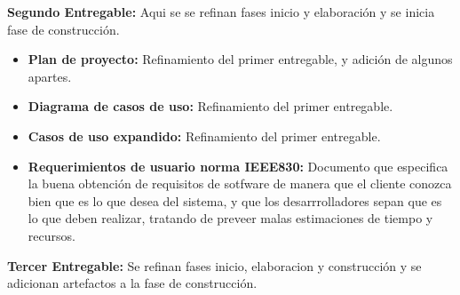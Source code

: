 \documentclass[11pt]{article}
\begin{document}
                \textbf{Segundo Entregable:} Aqui se se refinan fases inicio y elaboración y se
                inicia fase de construcción.
                
                \begin{itemize}
                \item\textbf{Plan de proyecto:} Refinamiento del primer entregable, y adición de
                algunos apartes.
                \item\textbf{Diagrama de casos de uso:} Refinamiento del primer entregable.
                \item\textbf{Casos de uso expandido:} Refinamiento del primer entregable.
                \item\textbf{Requerimientos de usuario norma IEEE830:} Documento que especifica la
                buena obtención de requisitos de sotfware de manera que el cliente conozca bien que
                es lo que desea del sistema, y que los desarrrolladores sepan que es lo que deben
                realizar, tratando de preveer malas estimaciones de tiempo y recursos.
                \end{itemize}
                
                \textbf{Tercer Entregable:} Se refinan fases inicio, elaboracion y construcción y
                se adicionan artefactos a la fase de construcción.
                
\end{document}

